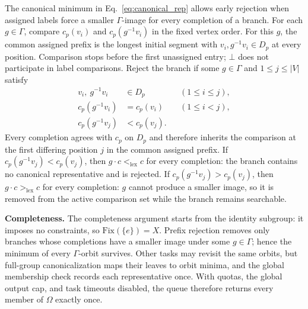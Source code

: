 \documentclass[a5paper, 10pt]{article}
\begin{document}
The canonical minimum in Eq.~\ref{eq:canonical_rep} allows early rejection when assigned labels force a smaller $\Gamma$-image for every completion of a branch.
For each $g\in\Gamma$, compare $c_p(v_i)$ and $c_p(g^{-1}v_i)$ in the fixed vertex order. For this $g$, the common assigned prefix is the longest initial segment with $v_i,g^{-1}v_i\in D_p$ at every position. Comparison stops before the first unassigned entry; $\bot$ does not participate in label comparisons. Reject the branch if some $g\in\Gamma$ and $1\leq j\leq |V|$ satisfy%
\begin{equation}
\begin{aligned}
v_i,\ g^{-1}v_i&\in D_p &&(1\leq i\leq j),\\
c_p(g^{-1}v_i)&=c_p(v_i) &&(1\leq i<j),\\
c_p(g^{-1}v_j)&<c_p(v_j).
\end{aligned}
\label{eq:prefix_rejection}
\end{equation}
Every completion agrees with $c_p$ on $D_p$ and therefore inherits the comparison at the first differing position $j$ in the common assigned prefix. If $c_p(g^{-1}v_j)<c_p(v_j)$, then $g\cdot c<_{\mathrm{lex}}c$ for every completion: the branch contains no canonical representative and is rejected. If $c_p(g^{-1}v_j)>c_p(v_j)$, then $g\cdot c>_{\mathrm{lex}}c$ for every completion: $g$ cannot produce a smaller image, so it is removed from the active comparison set while the branch remains searchable.

\medskip
\noindent\textbf{Completeness.}
The completeness argument starts from the identity subgroup: it imposes no constraints, so $\mathrm{Fix}(\{e\})=X$. Prefix rejection removes only branches whose completions have a smaller image under some $g\in\Gamma$; hence the minimum of every $\Gamma$-orbit survives. Other tasks may revisit the same orbits, but full-group canonicalization maps their leaves to orbit minima, and the global membership check records each representative once. With quotas, the global output cap, and task timeouts disabled, the queue therefore returns every member of $\Omega$ exactly once.
\end{document}
